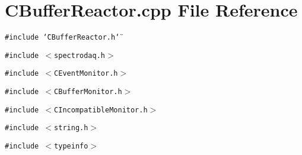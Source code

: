 \section{CBuffer\-Reactor.cpp File Reference}
\label{CBufferReactor_8cpp}
{\tt \#include \char`\"{}CBuffer\-Reactor.h\char`\"{}}\par
{\tt \#include $<$spectrodaq.h$>$}\par
{\tt \#include $<$CEvent\-Monitor.h$>$}\par
{\tt \#include $<$CBuffer\-Monitor.h$>$}\par
{\tt \#include $<$CIncompatible\-Monitor.h$>$}\par
{\tt \#include $<$string.h$>$}\par
{\tt \#include $<$typeinfo$>$}\par
